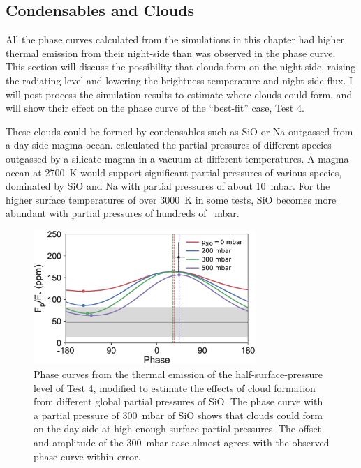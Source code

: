 \subsection{Condensables and Clouds}\label{sec:condensables}


All the phase curves calculated from the simulations in this chapter had higher thermal emission from their night-side than was observed in the phase curve. This section will discuss the possibility that clouds form on the night-side, raising the radiating level and lowering the brightness temperature and night-side flux. I will post-process the simulation results to estimate where clouds could form, and will show their effect on the phase curve of the ``best-fit'' case, Test 4.

These clouds could be formed by condensables such as SiO or Na outgassed from a day-side magma ocean. \citet{miguel2011compositions} calculated the partial pressures of different species outgassed by a silicate magma in a vacuum at different temperatures. A magma ocean at \SI{2700}{\kelvin} would support significant partial pressures of various species, dominated by SiO and Na with partial pressures of about \SI{10}{\milli\bar}. For the higher surface temperatures of over \SI{3000}{\kelvin} in some tests, SiO becomes more abundant with partial pressures of hundreds of \SI{}{\milli\bar}.


\begin{figure}
\centering
\includegraphics[width=0.75\textwidth]{figures/linking-climate-55cnce/phasecurves_clouds.eps}
\caption{Phase curves from the thermal emission of the half-surface-pressure level of Test 4, modified to estimate the effects of cloud formation from different global partial pressures of SiO. The phase curve with a partial pressure of \SI{300}{\milli\bar} of SiO shows that clouds could form on the day-side at high enough surface partial pressures.  The offset and amplitude of the \SI{300}{\milli\bar} case almost agrees with the observed phase curve within error.} \label{fig:phasecurves_clouds}
\end{figure}


